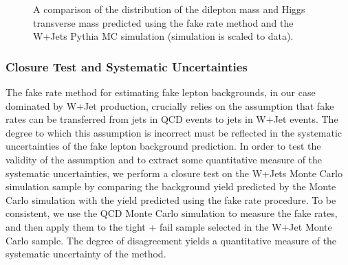 \begin{figure}[!htbp]
\begin{center}
\caption{A comparison of the distribution of the dilepton mass and Higgs transverse mass 
predicted using the fake rate method and the W+Jets Pythia MC simulation (simulation is scaled to data).}
\label{fig:FakeBkgDataDistribution_DileptonMassAndMtHiggs}
\end{center}
\end{figure}



\subsubsection{Closure Test and Systematic Uncertainties}
\label{sec:fakerateSystematics}

The fake rate method for estimating fake lepton backgrounds, in our case
dominated by W+Jet production, crucially relies on the assumption that
fake rates can be transferred from jets in QCD events to jets in W+Jet
events. The degree to which this assumption is incorrect must be 
reflected in the systematic uncertainties of the fake lepton 
background prediction. In order to test the validity of the assumption
and to extract some quantitative measure of the systematic uncertainties,
we perform a closure test on the W+Jets Monte Carlo simulation sample by 
comparing the background yield predicted by the Monte Carlo simulation
with the yield predicted using the fake rate procedure. To be consistent,
we use the QCD Monte Carlo simulation to measure the fake rates, and then
apply them to the tight + fail sample selected in the W+Jet Monte Carlo
sample. The degree of disagreement yields a quantitative measure of the 
systematic uncertainty of the method. 

